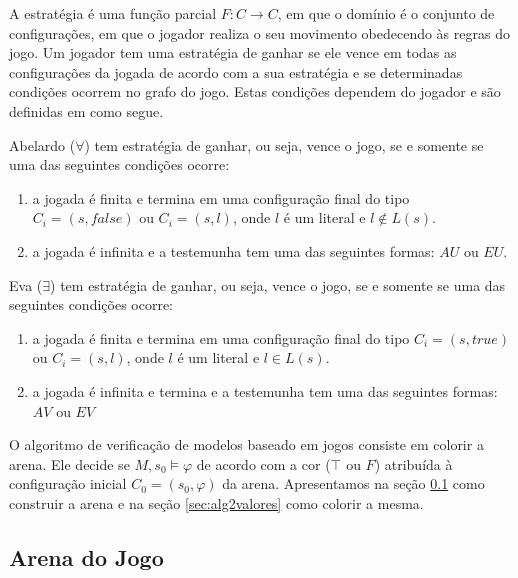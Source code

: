 \documentclass[normaltoc,capchap,capsec,times]{abnt}
\begin{document}
A estratégia é uma função parcial $F: C \to C$, em que o domínio é o conjunto de configurações, em que o jogador realiza o seu movimento obedecendo às regras do jogo. Um jogador tem uma estratégia de ganhar se ele vence em todas as configurações da jogada de acordo com a sua estratégia e se determinadas condições ocorrem no grafo do jogo. Estas condições dependem do jogador e são definidas em \cite{grumbergalg} como segue. %

\begin{description}[noitemsep]
	\item Abelardo ($\forall$) tem estratégia de ganhar, ou seja, vence o jogo, se e somente se uma das seguintes condições ocorre:
	\begin{enumerate}[label=(\arabic*),noitemsep]
		\item a jogada é finita e termina em uma configuração final do tipo $C_i = (s,false)$ ou $C_i = (s,l)$, onde $l$ é um literal e $l \notin L(s)$.
		\item a jogada é infinita e a testemunha tem uma das seguintes formas: $AU$ ou $EU$.
	\end{enumerate}
	
	\item Eva ($\exists$) tem estratégia de ganhar, ou seja, vence o jogo, se e somente se uma das seguintes condições ocorre:
	\begin{enumerate}[label=(\arabic*),noitemsep]
		\item a jogada é finita e termina em uma configuração final do tipo $C_i = (s,true)$ ou $C_i = (s,l)$, onde $l$ é um literal e $l \in L(s)$.
		\item a jogada é infinita e termina e a testemunha tem uma das seguintes formas: $AV$ ou $EV$
	\end{enumerate}
\end{description}

O algoritmo de verificação de modelos baseado em jogos consiste em colorir a arena. Ele decide se $M,s_0 \models \varphi$ de acordo com a cor ($ \top$ ou $ F$) atribuída à configuração inicial $C_0 = (s_0,\varphi)$ da arena. Apresentamos na seção \ref{sec:arena2valores} como construir a arena e na seção \ref{sec:alg2valores} como colorir a mesma. 

\subsection{Arena do Jogo }\label{sec:arena2valores}
\end{document}
